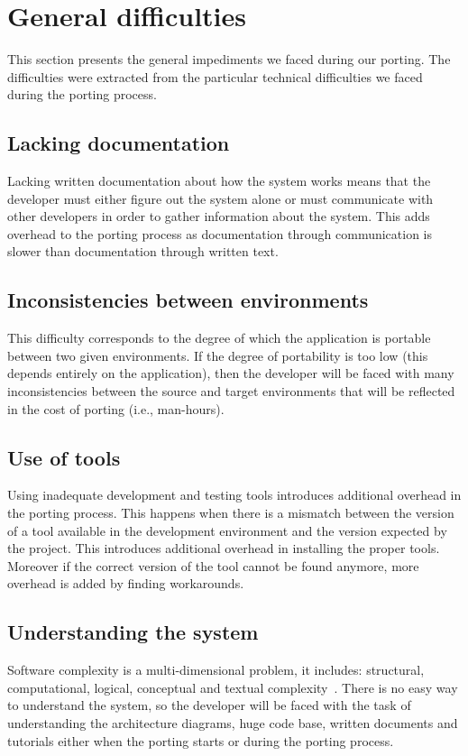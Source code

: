 \section{General difficulties}

This section presents the general impediments we faced during our porting. The
difficulties were extracted from the particular technical difficulties we faced
during the porting process.

\subsection{Lacking documentation}
Lacking written documentation about how the system works means
that the developer must either figure out the system alone or must communicate
with other developers in order to gather information about the system. This adds
overhead to the porting process as documentation through communication is
slower than documentation through written text.

\subsection{Inconsistencies between environments}
This difficulty corresponds to the degree of which the application is
portable~\cite{mooney2004developing} between two given environments. If the
degree of portability is too low (this depends entirely on the application), then
the developer will be faced with many inconsistencies between the source and
target environments that will be reflected in the cost of porting (i.e.,
man-hours).

\subsection{Use of tools}
Using inadequate development and testing tools introduces additional
overhead in the porting process. This happens when there is a mismatch between
the version of a tool available in the development environment and the version
expected by the project. This introduces additional overhead in installing the
proper tools. Moreover if the correct version of the tool cannot be found
anymore, more overhead is added by finding workarounds.

\subsection{Understanding the system}
Software complexity is a multi-dimensional problem, it includes: structural,
computational, logical, conceptual and textual complexity~\cite{ejiogu}. There
is no easy way to understand the system, so the developer will be faced with the
task of understanding the architecture diagrams, huge code base, written
documents and tutorials either when the porting starts or during the porting
process.

